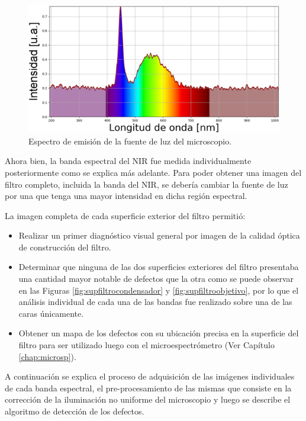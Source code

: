 \begin{figure}[H]
	\centering
	\includegraphics[width=1.0\textwidth]{Figs/defectosZEISS/espectrolampZEISSacolor.png}
	\caption{Espectro de emisión de la fuente de luz del microscopio.}
	\label{fig:espectrolamparazeiss}
\end{figure}

Ahora bien, la banda espectral del NIR fue medida individualmente posteriormente como se explica más adelante. Para poder obtener una imagen del filtro completo, incluida la banda del NIR, se debería cambiar la fuente de luz por una que tenga una mayor intensidad en dicha región espectral.

La imagen completa de cada superficie exterior del filtro permitió:
\begin{itemize}
	\item Realizar un primer diagnóstico visual general por imagen de la calidad óptica de construcción del filtro. 
	\item Determinar que ninguna de las dos superficies exteriores del filtro presentaba una cantidad mayor notable de defectos que la otra como se puede observar en las Figuras \ref{fig:supfiltrocondensador} y \ref{fig:supfiltroobjetivo}, por lo que el análisis individual de cada una de las bandas fue realizado sobre una de las caras únicamente.
	\item Obtener un mapa de los defectos con su ubicación precisa en la superficie del filtro para ser utilizado luego con el microespectrómetro (Ver Capítulo \ref{chap:microsp}).
\end{itemize}

A continuación se explica el proceso de adquisición de las imágenes individuales de cada banda espectral, el pre-procesamiento de las mismas que consiste en la corrección de la iluminación no uniforme del microscopio y luego se describe el algoritmo de detección de los defectos.


